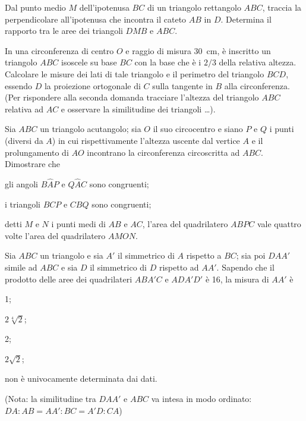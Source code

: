 \begin{multicols}{2}
\begin{esercizio}
\label{ese:6.94}
Dal punto medio $M$ dell'ipotenusa $BC$ di un triangolo rettangolo $ABC$, traccia la perpendicolare all'ipotenusa che incontra il cateto $AB$ in $D$. Determina il rapporto tra le aree dei triangoli $DMB$ e $ABC$.
\end{esercizio}

\begin{esercizio}
\label{ese:6.95}
In una circonferenza di centro $O$ e raggio di misura 30~cm, è inscritto un triangolo $ABC$ isoscele su base $BC$ con la base che è i $2/3$ della relativa altezza. Calcolare le misure dei lati di tale triangolo e il perimetro del triangolo $BCD$, essendo $D$ la proiezione ortogonale di $C$ sulla tangente in $B$ alla circonferenza. (Per rispondere alla seconda domanda tracciare l'altezza del triangolo $ABC$ relativa ad $AC$ e osservare la similitudine dei triangoli \ldots{}).
\end{esercizio}

\end{multicols}

\begin{esercizio}
\label{ese:6.96}
Sia $ABC$ un triangolo acutangolo; sia $O$ il suo circocentro e siano $P$ e $Q$ i punti (diversi da $A$) in cui rispettivamente l'altezza uscente dal vertice $A$ e il prolungamento di $AO$ incontrano la circonferenza circoscritta ad $ABC$. Dimostrare che
\begin{enumeratea}
\item gli angoli $B\widehat{A}P$ e $Q\widehat{A}C$ sono congruenti;
\item i triangoli $BCP$ e $CBQ$ sono congruenti;
\item detti $M$ e $N$ i punti medi di $AB$ e $AC$, l'area del quadrilatero $ABPC$ vale quattro volte l'area del quadrilatero $AMON$.
\end{enumeratea}
\end{esercizio}

\begin{esercizio}
\label{ese:6.97}
Sia $ABC$ un triangolo e sia $A'$ il simmetrico di $A$ rispetto a $BC$; sia poi $DAA'$ simile ad $ABC$ e sia $D$ il simmetrico di $D$ rispetto ad $AA'$. Sapendo che il prodotto delle aree dei quadrilateri $ABA'C$ e $ADA'D'$ è 16, la misura di $AA'$ è
\begin{enumeratea}
\item 1;
\item $2\sqrt[4]{2}$;
\item 2;
\item $2\sqrt{2}$;
\item non è univocamente determinata dai dati.
\end{enumeratea}
(Nota: la similitudine tra $DAA'$ e $ABC$ va intesa in modo ordinato: $DA : AB = AA':BC=A'D:CA$)
\end{esercizio}

